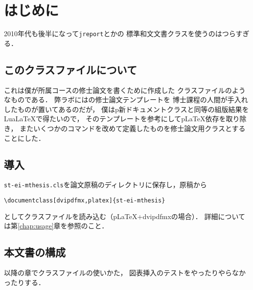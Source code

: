 \chapter{はじめに}
\begin{chapterabstract}
  2010年代も後半になって\texttt{jreport}とかの
  標準和文文書クラスを使うのはつらすぎる．
\end{chapterabstract}

\section{このクラスファイルについて}
これは僕が所属コースの修士論文を書くために作成した
{\LaTeXe}クラスファイルのようなものである．
弊ラボには\cite{mthesis-tmpl}の修士論文テンプレートを
博士課程の人間が手入れしたものが置いてあるのだが，
僕は{p\LaTeXe}新ドキュメントクラスと同等の組版結果を{Lua\LaTeX}で得たいので，
そのテンプレートを参考にして{p\LaTeX}依存を取り除き，
またいくつかのコマンドを改めて定義したものを修士論文用クラスとすることにした．

\section{導入}
\texttt{st-ei-mthesis.cls}を論文原稿のディレクトリに保存し，原稿から
\begin{verbatim}
\documentclass[dvipdfmx,platex]{st-ei-mthesis}
\end{verbatim}
としてクラスファイルを読み込む（{p\LaTeX}+dvipdfmxの場合）．
詳細については第\ref{chap:usage}章を参照のこと．

\section{本文書の構成}
以降の章でクラスファイルの使いかた，
図表挿入のテストをやったりやらなかったりする．